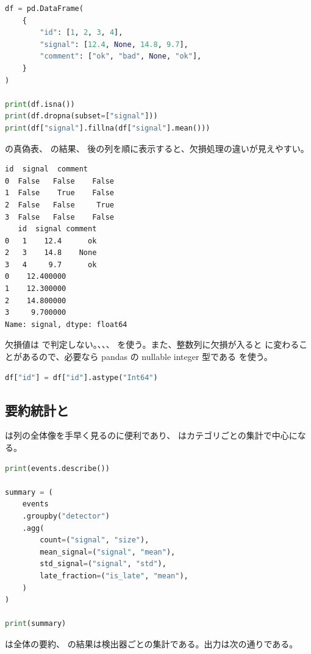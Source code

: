 \begin{lstlisting}[language=Python]
df = pd.DataFrame(
    {
        "id": [1, 2, 3, 4],
        "signal": [12.4, None, 14.8, 9.7],
        "comment": ["ok", "bad", None, "ok"],
    }
)

print(df.isna())
print(df.dropna(subset=["signal"]))
print(df["signal"].fillna(df["signal"].mean()))
\end{lstlisting}

 の真偽表、 の結果、 後の列を順に表示すると、欠損処理の違いが見えやすい。

\begin{lstlisting}[numbers=none, xleftmargin=2\zw]
      id  signal  comment
0  False   False    False
1  False    True    False
2  False   False     True
3  False   False    False
   id  signal comment
0   1    12.4      ok
2   3    14.8    None
3   4     9.7      ok
0    12.400000
1    12.300000
2    14.800000
3     9.700000
Name: signal, dtype: float64
\end{lstlisting}

欠損値は \code{==} で判定しない。、、、 を使う。また、整数列に欠損が入ると  に変わることがあるので、必要なら pandas の nullable integer 型である  を使う。

\begin{lstlisting}[language=Python]
df["id"] = df["id"].astype("Int64")
\end{lstlisting}

\subsection{要約統計と }

 は列の全体像を手早く見るのに便利であり、 はカテゴリごとの集計で中心になる。

\begin{lstlisting}[language=Python]
print(events.describe())

summary = (
    events
    .groupby("detector")
    .agg(
        count=("signal", "size"),
        mean_signal=("signal", "mean"),
        std_signal=("signal", "std"),
        late_fraction=("is_late", "mean"),
    )
)

print(summary)
\end{lstlisting}

 は全体の要約、 の結果は検出器ごとの集計である。出力は次の通りである。

